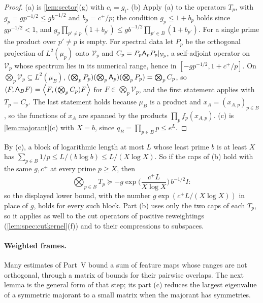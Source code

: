 \begin{proof}
(a) is \cref{lem:sector}(g) with $c_i=g_i$. (b) Apply (a) to the operators
$T_p$, with $g_p=gp^{-1/2}\le gb^{-1/2}$ and $b_p=c^+/p$; the condition
$g_p\le1+b_p$ holds since $gp^{-1/2}<1$, and
$g_p\prod_{p'\ne p}(1+b_{p'})\le gb^{-1/2}\prod_{p'\in B}(1+b_{p'})$. For a single
prime the product over $p'\ne p$ is empty. For spectral data let $P_p$ be the
orthogonal projection of $L^2(\mu_p)$ onto $\mathcal V_p$ and
$C_p=P_p\mathsf A_p P_p|_{\mathcal V_p}$, a self-adjoint operator on $\mathcal V_p$
whose spectrum lies in its numerical range, hence in
$[-gp^{-1/2},1+c^+/p]$. On $\bigotimes_p\mathcal V_p\subseteq L^2(\mu_B)$,
$(\bigotimes_pP_p)(\bigotimes_p\mathsf A_p)(\bigotimes_pP_p)=\bigotimes_pC_p$, so
$\left\langle F,\mathsf A_BF\right\rangle=\left\langle F,(\bigotimes_pC_p)F\right\rangle$ for $F\in\bigotimes_p\mathcal
V_p$, and the first statement applies with $T_p=C_p$. The last statement holds
because $\mu_B$ is a product and $x_A=(x_{A,p})_{p\in B}$, so the functions of
$x_A$ are spanned by the products $\prod_pf_p(x_{A,p})$. (c) is
\cref{lem:majorant}(c) with $X=b$, since $q_B=\prod_{p\in B}p\le e^L$.
\end{proof}

By (c), a block of logarithmic length at most $L$ whose least prime $b$ is at
least $X$ has $\sum_{p\in B}1/p\le L/(b\log b)\le L/(X\log X)$. So if the caps of
(b) hold with the same $g,c^+$ at every prime $p\ge X$, then
\[
  \bigotimes_{p\in B}T_p\succeq-g\exp\Big(\frac{c^+L}{X\log X}\Big)\,b^{-1/2}I :
\]
so the displayed lower bound, with the number $g\exp(c^+L/(X\log X))$ in place of $g$, holds for every such block. Part (b) uses only the two caps of each $T_p$, so it applies as well
to the cut operators of positive reweightings (\cref{lem:spec:cutkernel}(f)) and
to their compressions to subspaces.

\paragraph{Weighted frames.}
Many estimates of Part~V bound a sum of feature maps whose ranges are not
orthogonal, through a matrix of bounds for their pairwise overlaps. The next
lemma is the general form of that step; its part (c) reduces the largest
eigenvalue of a symmetric majorant to a small matrix when the majorant has
symmetries.

